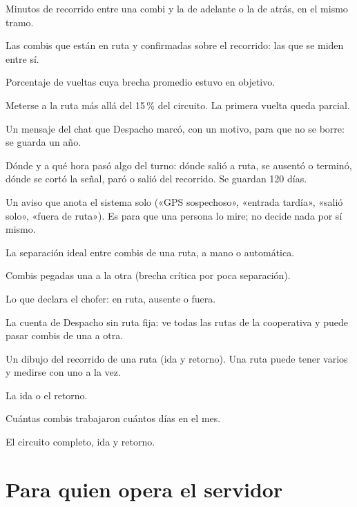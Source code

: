 \documentclass[11pt,a4paper,oneside]{book}
\begin{document}
\begin{description}[leftmargin=0pt,labelsep=0.6em,itemsep=3pt]
  \item[Brecha.] Minutos de recorrido entre una combi y la de adelante o la de
    atrás, en el mismo tramo.
  \item[Cadena.] Las combis que están en ruta y confirmadas sobre el
    recorrido: las que se miden entre sí.
  \item[Cumplimiento.] Porcentaje de vueltas cuya brecha promedio estuvo en
    objetivo.
  \item[Entrada tardía.] Meterse a la ruta más allá del 15\,\% del circuito.
    La primera vuelta queda parcial.
  \item[Evidencia.] Un mensaje del chat que Despacho marcó, con un motivo,
    para que no se borre: se guarda un año.
  \item[Lugares puntuales.] Dónde y a qué hora pasó algo del turno: dónde
    salió a ruta, se ausentó o terminó, dónde se cortó la señal, paró o salió
    del recorrido. Se guardan 120 días.
  \item[Marca automática.] Un aviso que anota el sistema solo («GPS
    sospechoso», «entrada tardía», «salió solo», «fuera de ruta»). Es para
    que una persona lo mire; no decide nada por sí mismo.
  \item[Objetivo de brecha.] La separación ideal entre combis de una ruta, a
    mano o automática.
  \item[Pelotón.] Combis pegadas una a la otra (brecha crítica por poca
    separación).
  \item[Presencia.] Lo que declara el chofer: en ruta, ausente o fuera.
  \item[Supervisor.] La cuenta de Despacho sin ruta fija: ve todas las rutas de
    la cooperativa y puede pasar combis de una a otra.
  \item[Trazado.] Un dibujo del recorrido de una ruta (ida y retorno). Una ruta
    puede tener varios y medirse con uno a la vez.
  \item[Tramo.] La ida o el retorno.
  \item[Unidades-día.] Cuántas combis trabajaron cuántos días en el mes.
  \item[Vuelta.] El circuito completo, ida y retorno.
\end{description}

\appendix
\chapter{Para quien opera el servidor}
\label{cap:operacion}
\end{document}
